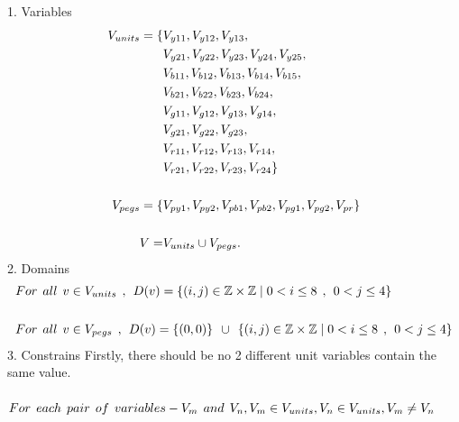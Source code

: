 1. Variables
\begin{align*}
V_{units}=\{&V_{y11},V_{y12},V_{y13},\\&V_{y21},V_{y22},V_{y23},V_{y24},V_{y25},\\&V_{b11},V_{b12},V_{b13},V_{b14},
V_{b15},\\&V_{b21},V_{b22},V_{b23},V_{b24},\\&V_{g11},V_{g12},V_{g13},V_{g14},\\&V_{g21},V_{g22},V_{g23},\\&V_{r11},
V_{r12},V_{r13},V_{r14},\\&V_{r21},V_{r22},V_{r23},V_{r24}\}\\
\\V_{pegs} = \{&V_{py1}, V_{py2}, V_{pb1}, V_{pb2}, V_{pg1}, V_{pg2}, V_{pr}\}\\
\\V = &V_{units} \cup V_{pegs}.
\end{align*}
2. Domains
\begin{align*}
&For \hspace{1ex} all \hspace{1ex} v \in V_{units} \hspace{1ex},\hspace{1ex} D(v)=\{(i,j) \in \mathbb{Z} \times \mathbb{Z}	\mid  0<i \leq 8 \hspace{1ex} , \hspace{1ex} 0<j \leq 4\}\\
\\
&For \hspace{1ex} all \hspace{1ex} v \in V_{pegs} \hspace{1ex},\hspace{1ex} D(v)=\{(0,0)\} \hspace{1ex} \cup \hspace{1ex}\{(i,j) \in \mathbb{Z} \times \mathbb{Z}\mid  0<i \leq 8 \hspace{1ex} , \hspace{1ex} 0<j \leq 4\}
\end{align*}
3. Constrains
Firstly, there should be no 2 different unit variables contain the same value.\\
\\ 
$For \hspace{1ex} each \hspace{1ex} pair\hspace{1ex} of \hspace{1ex}variables-V_{m} \hspace{1ex} and \hspace{1ex} V_{n}, V_{m} \in V_{units}, V_{n} \in V_{units},V_{m} \neq V_{n}  $

